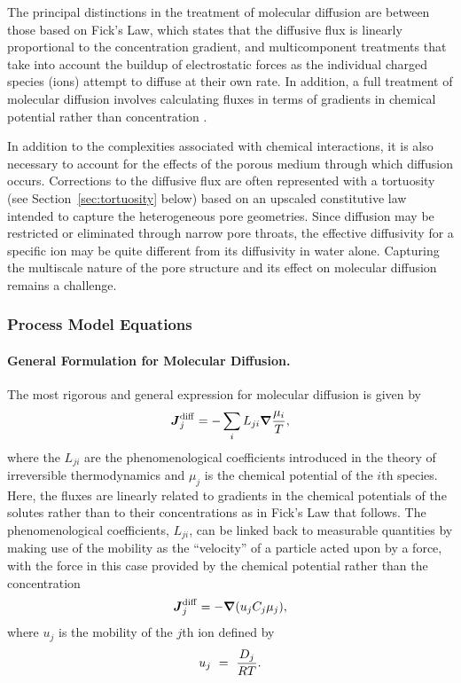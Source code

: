 \noindent The principal distinctions in the treatment of molecular diffusion are between those based on Fick's Law, which states that the diffusive flux is linearly proportional to the concentration gradient, and multicomponent treatments that take into account the buildup of electrostatic forces as the individual charged species (ions) attempt to diffuse at their own rate.  In addition, a full treatment of molecular diffusion involves calculating fluxes in terms of gradients in chemical potential rather than concentration \citep{steefel2009fluid}.

\noindent In addition to the complexities associated with chemical interactions, it is also necessary to account for the effects of the porous medium through which diffusion occurs.  Corrections to the diffusive flux are often represented with a tortuosity (see Section~\ref{sec:tortuosity} below) based on an upscaled constitutive law intended to capture the heterogeneous pore geometries.  Since diffusion may be restricted or eliminated through narrow pore throats, the effective diffusivity for a specific ion may be quite different from its diffusivity in water alone.  Capturing the multiscale nature of the pore structure and its effect on molecular diffusion remains a challenge.



\subsubsection{Process Model Equations}

\paragraph{General Formulation for Molecular Diffusion.}

The most rigorous and general expression for molecular diffusion is given by
\begin{equation} \label{eq:OnsagerReciprocal} 
  \boldsymbol{J}_{j}^{\rm diff} =-\sum_{i}{L_{ji}\boldsymbol{\nabla}\frac{\mu _{i}}{T}},
\end{equation} 
where the $L_{ji}$ are the phenomenological coefficients introduced in
the theory of irreversible thermodynamics
\citep{onsager1931reciprocal,prigogine1968introduction,lasaga1998kinetic}
and $\mu_j$ is the chemical potential of the $i$th species.  Here, the
fluxes are linearly related to gradients in the chemical potentials of
the solutes rather than to their concentrations as in Fick's Law that
follows.  The phenomenological coefficients, $L_{ji}$, can be linked
back to measurable quantities by making use of the mobility as the
``velocity'' of a particle acted upon by a force, with the force in
this case provided by the chemical potential rather than the
concentration
\begin{equation} \label{eq:ChemicalPotentialGradient)} 
  \boldsymbol{J}_{j}^{\rm diff} =-\boldsymbol{\nabla} ( u_{j} C_{j} \mu _{j}), 
\end{equation} 
where $u_{j}$ is the mobility of the $j$th ion defined by
\begin{equation} \label{eq:IonMobility} 
  u_{j} \ =\  \frac{D_j}{RT}.
\end{equation} 



